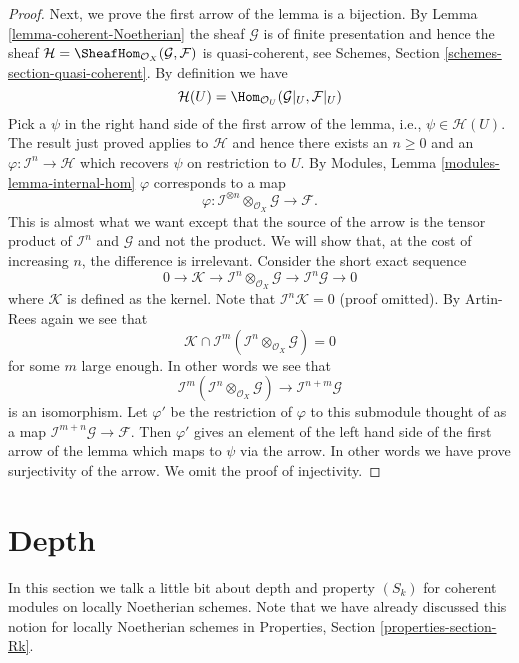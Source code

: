 \begin{proof}
\medskip\noindent
Next, we prove the first arrow of the lemma is a bijection.
By Lemma \ref{lemma-coherent-Noetherian} the sheaf $\mathcal{G}$
is of finite presentation and hence the sheaf
$\mathcal{H} = \SheafHom_{\mathcal{O}_X}(\mathcal{G}, \mathcal{F})$
is quasi-coherent, see
Schemes, Section \ref{schemes-section-quasi-coherent}.
By definition we have
$$
\mathcal{H}(U)
=
\Hom_{\mathcal{O}_U}(\mathcal{G}|_U, \mathcal{F}|_U)
$$
Pick a $\psi$ in the right hand side of the first arrow of the
lemma, i.e.,  $\psi \in \mathcal{H}(U)$. The result just proved applies
to $\mathcal{H}$ and hence there exists an $n \geq 0$ and an
$\varphi : \mathcal{I}^n \to \mathcal{H}$ which recovers
$\psi$ on restriction to $U$. By
Modules, Lemma \ref{modules-lemma-internal-hom}
$\varphi$ corresponds to a map
$$
\varphi :
\mathcal{I}^{\otimes n} \otimes_{\mathcal{O}_X} \mathcal{G}
\longrightarrow
\mathcal{F}.
$$
This is almost what we want except that the source of the arrow
is the tensor product of $\mathcal{I}^n$ and $\mathcal{G}$
and not the product. We will show that, at the cost of increasing $n$,
the difference is irrelevant. Consider the short exact sequence
$$
0 \to \mathcal{K} \to
\mathcal{I}^n \otimes_{\mathcal{O}_X} \mathcal{G} \to
\mathcal{I}^n\mathcal{G} \to 0
$$
where $\mathcal{K}$ is defined as the kernel. Note that
$\mathcal{I}^n\mathcal{K} = 0$ (proof omitted). By Artin-Rees
again we see that
$$
\mathcal{K}
\cap
\mathcal{I}^m(\mathcal{I}^n \otimes_{\mathcal{O}_X} \mathcal{G})
=
0
$$
for some $m$ large enough. In other words we see that
$$
\mathcal{I}^m(\mathcal{I}^n \otimes_{\mathcal{O}_X} \mathcal{G})
\longrightarrow
\mathcal{I}^{n + m}\mathcal{G}
$$
is an isomorphism. Let $\varphi'$ be the restriction of
$\varphi$ to this submodule thought of as a map
$\mathcal{I}^{m + n}\mathcal{G} \to \mathcal{F}$.
Then $\varphi'$ gives an element
of the left hand side of the first arrow of the lemma which
maps to $\psi$ via the arrow. In other words we have prove surjectivity
of the arrow. We omit the proof of injectivity.
\end{proof}









\section{Depth}
\label{section-depth}

\noindent
In this section we talk a little bit about depth and property
$(S_k)$ for coherent modules on locally Noetherian schemes.
Note that we have already discussed this notion for locally
Noetherian schemes in Properties, Section \ref{properties-section-Rk}.

